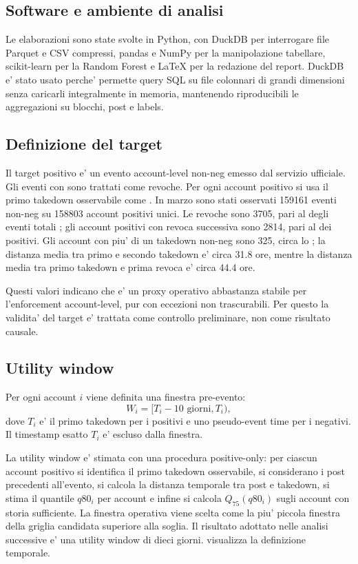 \subsection{Software e ambiente di analisi}

Le elaborazioni sono state svolte in Python, con DuckDB per interrogare file Parquet e CSV compressi, pandas e NumPy per la manipolazione tabellare, scikit-learn per la Random Forest e LaTeX per la redazione del report. DuckDB e' stato usato perche' permette query SQL su file colonnari di grandi dimensioni senza caricarli integralmente in memoria, mantenendo riproducibili le aggregazioni su blocchi, post e labels.

\subsection{Definizione del target}

Il target positivo e' un evento account-level  non-neg emesso dal servizio ufficiale. Gli eventi con  sono trattati come revoche. Per ogni account positivo si usa il primo takedown osservabile come . In marzo sono stati osservati \num{159161} eventi non-neg su \num{158803} account positivi unici. Le revoche sono \num{3705}, pari al  degli eventi totali ; gli account positivi con revoca successiva sono \num{2814}, pari al  dei positivi. Gli account con piu' di un takedown non-neg sono \num{325}, circa lo ; la distanza media tra primo e secondo takedown e' circa \num{31.8} ore, mentre la distanza media tra primo takedown e prima revoca e' circa \num{44.4} ore.

Questi valori indicano che  e' un proxy operativo abbastanza stabile per l'enforcement account-level, pur con eccezioni non trascurabili. Per questo la validita' del target e' trattata come controllo preliminare, non come risultato causale.

\subsection{Utility window}

Per ogni account $i$ viene definita una finestra pre-evento:
\[
W_i=[T_i-10\text{ giorni},T_i),
\]
dove $T_i$ e' il primo takedown per i positivi e uno pseudo-event time per i negativi. Il timestamp esatto $T_i$ e' escluso dalla finestra.

La utility window e' stimata con una procedura positive-only: per ciascun account positivo si identifica il primo takedown osservabile, si considerano i post precedenti all'evento, si calcola la distanza temporale tra post e takedown, si stima il quantile $q80_i$ per account e infine si calcola $Q_{75}(q80_i)$ sugli account con storia sufficiente. La finestra operativa viene scelta come la piu' piccola finestra della griglia candidata superiore alla soglia. Il risultato adottato nelle analisi successive e' una utility window di dieci giorni.  visualizza la definizione temporale.

